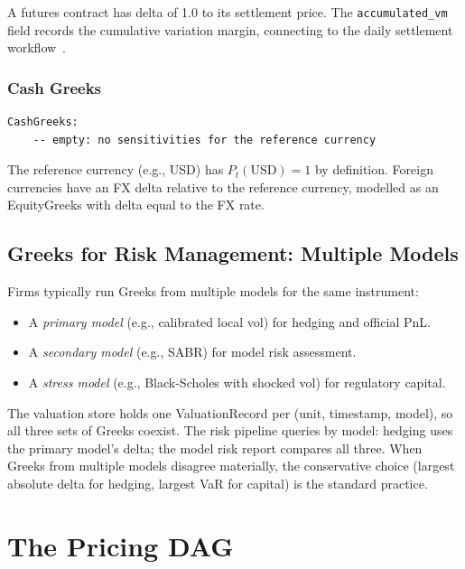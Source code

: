 \documentclass[11pt,a4paper]{article}
\begin{document}
\noindent A futures contract has delta of 1.0 to its settlement price.  The \texttt{accumulated\_vm} field records the cumulative variation margin, connecting to the daily settlement workflow~\cite[\S14.4.1]{ledger}.

\subsubsection{Cash Greeks}

\begin{lstlisting}
CashGreeks:
    -- empty: no sensitivities for the reference currency
\end{lstlisting}

\noindent The reference currency (e.g., USD) has $P_t(\mathrm{USD}) = 1$ by definition.  Foreign currencies have an FX delta relative to the reference currency, modelled as an EquityGreeks with delta equal to the FX rate.

\subsection{Greeks for Risk Management: Multiple Models}

Firms typically run Greeks from multiple models for the same instrument:

\begin{itemize}[nosep]
\item A \emph{primary model} (e.g., calibrated local vol) for hedging and official PnL.
\item A \emph{secondary model} (e.g., SABR) for model risk assessment.
\item A \emph{stress model} (e.g., Black-Scholes with shocked vol) for regulatory capital.
\end{itemize}

\noindent The valuation store holds one ValuationRecord per (unit, timestamp, model), so all three sets of Greeks coexist.  The risk pipeline queries by model: hedging uses the primary model's delta; the model risk report compares all three.  When Greeks from multiple models disagree materially, the conservative choice (largest absolute delta for hedging, largest VaR for capital) is the standard practice.

\clearpage
\section{The Pricing DAG}
\label{sec:pricing-dag}
\end{document}
